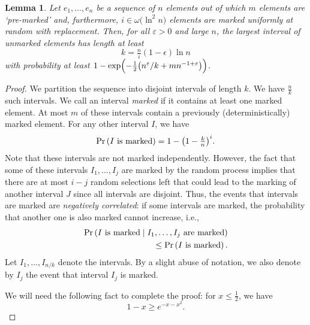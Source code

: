 \documentclass{article}
\newtheorem{lem}[thm]{Lemma}
\newcommand{\Pro}[1]{\mbox{{\rm Pr}}\left(#1\right)}
\begin{document}
\begin{lem}
\label{freeinterval_lemma}
   Let $e_1,\dots, e_n$ be a sequence of $n$ elements out of which $m$ elements are `pre-marked' and, furthermore, $i \in \omega\bigl(\ln^2 n\bigr)$ elements are marked uniformly at random with replacement. Then, for all $\varepsilon >0$ and large $n$, the largest interval of unmarked elements has length at least 
\begin{equation*}k= \tfrac{n}{i}(1-\epsilon)\ln n\end{equation*}
 with probability at least 
$1-\exp\Bigl(-\tfrac{1}{2}\bigl(n^{\varepsilon}/k +mn^{-1+\varepsilon}\bigr)\Bigr)$.
\end{lem}\begin{proof}
We partition the sequence into disjoint intervals of length $k$. We have $\frac{n}{k}$ such intervals. We call an interval \emph{marked} if it contains at least one marked element. At most $m$ of these intervals contain a previously (deterministically) marked element. For any other interval $I$, we have
\begin{equation}
\label{freeprob}
\Pro{I \text{ is marked}} = 1-\bigl(1-\tfrac{k}{n}\bigr)^{i}.
\end{equation}
Note that these intervals are not marked independently. However, the fact that some of these intervals $I_1, \dots, I_j$ are marked by the random process implies that there are at most $i-j$ random selections left that could lead to the marking of another interval $J$ since all intervals are disjoint. Thus, the events that intervals are marked are \emph{negatively correlated}: if some intervals are marked, the probability that another one is also marked cannot increase, i.e., 
\begin{equation}
\label{negative_correlation}
\begin{split}
\Pro{\text{$I$ is marked} \mid I_1, \dots, I_j \text{ are marked}} \\
			\leq \Pro{\text{$I$ is marked}}. 
\end{split}
\end{equation} 
Let $I_1, \dots, I_{n/k}$ denote the intervals. By a slight abuse of notation, we also denote by $I_j$ the event that interval $I_j$ is marked.

We will need the following fact to complete the proof: for $x \leq \tfrac{1}{2}$, we have 
\begin{equation}
\label{exp_ineq}
 1-x \geq e^{-x-x^2}.
\end{equation}


\end{proof}
\end{document}
